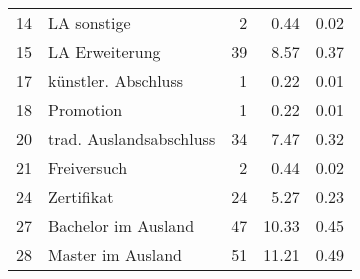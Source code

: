 \begin{longtable}{lXrrr}
        14 & \multicolumn{1}{X}{LA sonstige} & %
          \num{2} &
          \num[round-mode=places,round-precision=2]{0.44} &
          \num[round-mode=places,round-precision=2]{0.02} \\

        15 & \multicolumn{1}{X}{LA Erweiterung} & %
          \num{39} &
          \num[round-mode=places,round-precision=2]{8.57} &
          \num[round-mode=places,round-precision=2]{0.37} \\

        17 & \multicolumn{1}{X}{künstler. Abschluss} & %
          \num{1} &
          \num[round-mode=places,round-precision=2]{0.22} &
          \num[round-mode=places,round-precision=2]{0.01} \\

        18 & \multicolumn{1}{X}{Promotion} & %
          \num{1} &
          \num[round-mode=places,round-precision=2]{0.22} &
          \num[round-mode=places,round-precision=2]{0.01} \\

        20 & \multicolumn{1}{X}{trad. Auslandsabschluss} & %
          \num{34} &
          \num[round-mode=places,round-precision=2]{7.47} &
          \num[round-mode=places,round-precision=2]{0.32} \\

        21 & \multicolumn{1}{X}{Freiversuch} & %
          \num{2} &
          \num[round-mode=places,round-precision=2]{0.44} &
          \num[round-mode=places,round-precision=2]{0.02} \\

        24 & \multicolumn{1}{X}{Zertifikat} & %
          \num{24} &
          \num[round-mode=places,round-precision=2]{5.27} &
          \num[round-mode=places,round-precision=2]{0.23} \\

        27 & \multicolumn{1}{X}{Bachelor im Ausland} & %
          \num{47} &
          \num[round-mode=places,round-precision=2]{10.33} &
          \num[round-mode=places,round-precision=2]{0.45} \\

        28 & \multicolumn{1}{X}{Master im Ausland} & %
          \num{51} &
          \num[round-mode=places,round-precision=2]{11.21} &
          \num[round-mode=places,round-precision=2]{0.49} \\


\end{longtable}

